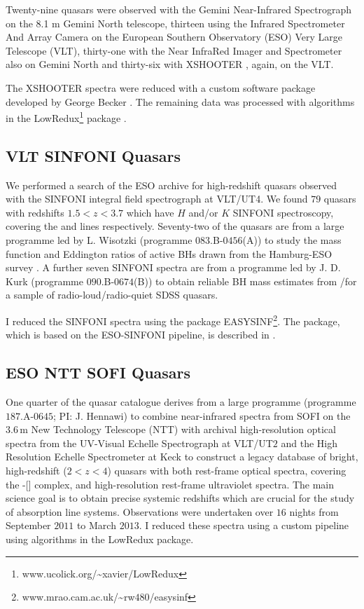 Twenty-nine quasars were observed with the Gemini Near-Infrared Spectrograph \citep[GNIRS;][]{elias06} on the 8.1 m Gemini North telescope, thirteen using the Infrared Spectrometer And Array Camera \citep[ISAAC;][]{moorwood98b} on the European Southern Observatory (ESO) Very Large Telescope (VLT), thirty-one with the Near InfraRed Imager and Spectrometer \citep[NIRI;][]{hodapp03} also on Gemini North and thirty-six with XSHOOTER \citep{vernet11}, again, on the VLT. 

The  XSHOOTER  spectra  were  reduced  with  a  custom  software  package  developed  by  George  Becker \citep[for details, see][]{lau16}. 
The remaining data was processed with algorithms in the LowRedux\footnote{www.ucolick.org/\textasciitilde xavier/LowRedux} package \citep[see][]{prochaska09}.

\subsection{VLT SINFONI Quasars}

We performed a search of the ESO archive for high-redshift quasars observed with the SINFONI  integral  field  spectrograph \citep{eisenhauer03,bonnet04} at VLT/UT4.
We found $79$ quasars with redshifts $1.5 < z < 3.7$ which have $H$ and/or $K$ SINFONI spectroscopy, covering the \hb and \ha lines respectively. 
Seventy-two of the quasars are from a large programme led by L. Wisotzki (programme $083$.B-$0456$(A)) to study the mass function and Eddington ratios of active BHs drawn from the Hamburg-ESO survey \citep{wisotzki00}.
A further seven SINFONI spectra are from a programme led by  J. D. Kurk (programme $090$.B-$0674$(B)) to obtain reliable BH mass estimates from \hans/\hb for a sample of radio-loud/radio-quiet SDSS quasars.

I reduced the SINFONI spectra using the package EASYSINF\footnote{www.mrao.cam.ac.uk/\textasciitilde rw$480$/easysinf}.  
The package, which is based on the ESO-SINFONI pipeline, is described in \citet{williams16}. 

\subsection{ESO NTT SOFI Quasars}

One quarter of the quasar catalogue derives from a large programme (programme $187$.A-$0645$; PI: J. Hennawi) to combine near-infrared spectra from SOFI \citep{moorwood98a} on the $3.6$\,m New Technology Telescope (NTT) with archival high-resolution optical spectra from the UV-Visual Echelle Spectrograph \citep[UVES;][]{dekker00} at VLT/UT$2$ and the High Resolution Echelle Spectrometer \citep[HIRES;][]{vogt94} at Keck to construct a legacy database of bright, high-redshift ($2 < z < 4$) quasars with both rest-frame optical spectra, covering the \hbns-[] complex, and high-resolution rest-frame ultraviolet spectra.
The main science goal is to obtain precise systemic redshifts which are crucial for the study of absorption line systems.  
Observations were undertaken over $16$ nights from September $2011$ to March $2013$.
I reduced these spectra using a custom pipeline using algorithms in the LowRedux package.

